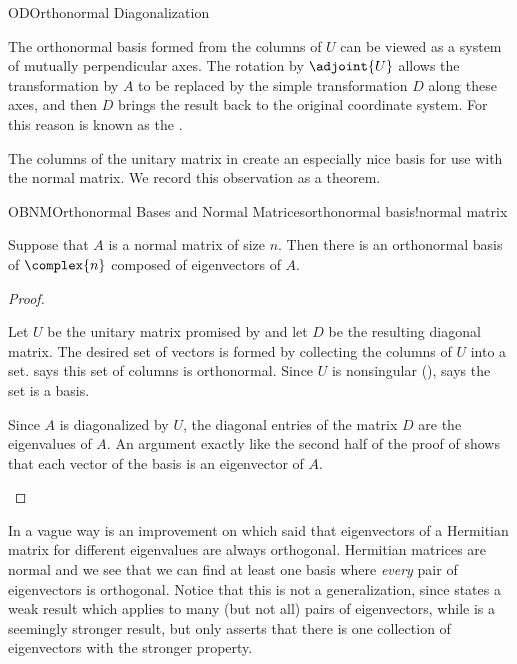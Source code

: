\begin{subsect}{OD}{Orthonormal Diagonalization}
%
\begin{para}The orthonormal basis formed from the columns of $U$ can be viewed as a system of mutually perpendicular axes.  The rotation by $\adjoint{U}$ allows the transformation by $A$ to be replaced by the simple transformation $D$ along these axes, and then $D$ brings the result back to the original coordinate system.  For this reason  is known as the .\end{para}
%
%
\begin{para}The columns of the unitary matrix in  create an especially nice basis for use with the normal matrix.  We record this observation as a theorem.\end{para}
%
\begin{theorem}{OBNM}{Orthonormal Bases and Normal Matrices}{orthonormal basis!normal matrix}
\begin{para}Suppose that $A$ is a normal matrix of size $n$.  Then there is an orthonormal basis of $\complex{n}$ composed of eigenvectors of $A$.\end{para}
\end{theorem}
%
\begin{proof}
\begin{para}Let $U$ be the unitary matrix promised by  and let $D$ be the resulting diagonal matrix.  The desired set of vectors is formed by collecting the columns of $U$ into a set.   says this set of columns is orthonormal.  Since $U$ is nonsingular (),  says the set is a basis.\end{para}
%
\begin{para}Since $A$ is diagonalized by $U$, the diagonal entries of the matrix $D$ are the eigenvalues of $A$.  An argument exactly like the second half of the proof of  shows that each vector of the basis is an eigenvector of $A$.\end{para}
%
\end{proof}
%
\begin{para}In a vague way  is an improvement on  which said that eigenvectors of a Hermitian matrix for different eigenvalues are always orthogonal.  Hermitian matrices are normal and we see that we can find at least one basis where {\em every} pair of eigenvectors is orthogonal.  Notice that this is not a generalization, since  states a weak result which applies to many (but not all) pairs of eigenvectors, while  is a seemingly stronger result, but only asserts that there is one collection of eigenvectors with the stronger property.\end{para}
%
\end{subsect}
%



